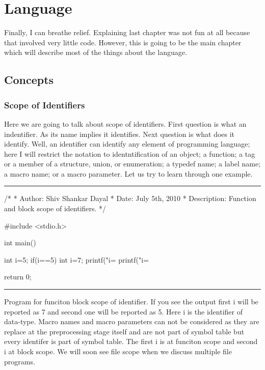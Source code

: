 


\chapter{Language}
\startcolumns[n=3,distance=2em]
  \placelist
    [section]
    [alternative=c, %
     interaction=all,]
\stopcolumns
Finally, I can breathe relief. Explaining last chapter was not fun at
all because that involved very little code. However, this is going to
be the main chapter which will describe most of the things about the
language.

\section{Concepts}
\subsection{Scope of Identifiers}
Here we are going to talk about scope of identifiers. First question
is what an indentifier. As its name implies it identifies. Next
question is what does it identify. Well, an identifier can identify
any element of programming language; here I will restrict the notation
to identntification of an object; a function; a tag or a member of a
structure, union, or enumeration; a typedef name; a label name; a
macro name; or a macro parameter. Let us try to learn through one example.
\blank[force,1mm]\hrule\blank[force,1mm]
\startCPP
/*
 * Author: Shiv Shankar Dayal
 * Date: July 5th, 2010
 * Description: Function and block scope of identifiers.
 */

#include <stdio.h>

int main()
{
  int i=5;
  if(i==5)
    {
      int i=7;
      printf("i=%
    }
  printf("i=%

  return 0;
}

\stopCPP
{}
\hrule
\blank[force,1mm]
\startalignment[middle]
Program for funciton block scope of identifier.
\stopalignment
If you see the output first i will be reported as 7 and second one
will be reported as 5. Here i is the identifier of 
data-type. Macro names and macro parameters can not be considered as
they are replace at the preprocessing stage itself and are not part of
symbol table but every identifer is part of symbol table. The first i
is at funciton scope and second i at block scope. We will soon see
file scope when we discuss multiple file programs.

